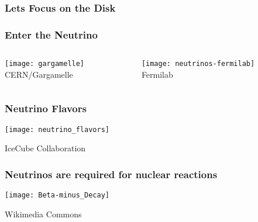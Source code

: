 \documentclass[]{beamer}
\begin{document}
\begin{frame}
  \frametitle{Lets Focus on the Disk}
  \begin{center}
  \end{center}
\end{frame}

\begin{frame}
  \frametitle{Enter the Neutrino}
  \begin{columns}
    \begin{column}{6cm}
      \begin{center}
        \texttt{[image: gargamelle]}\\
        CERN/Gargamelle
      \end{center}
    \end{column}
    \begin{column}{6cm}
      \begin{center}
        \texttt{[image: neutrinos-fermilab]}\\
        Fermilab
      \end{center}
    \end{column}
  \end{columns}
\end{frame}

\begin{frame}
  \frametitle{Neutrino Flavors}
  \begin{center}
    \texttt{[image: neutrino\_flavors]}
  \end{center}
  IceCube Collaboration
\end{frame}

\begin{frame}
  \frametitle{Neutrinos are required for nuclear reactions}
  \begin{center}
    \texttt{[image: Beta-minus\_Decay]}
  \end{center}
  Wikimedia Commons
\end{frame}
\end{document}
